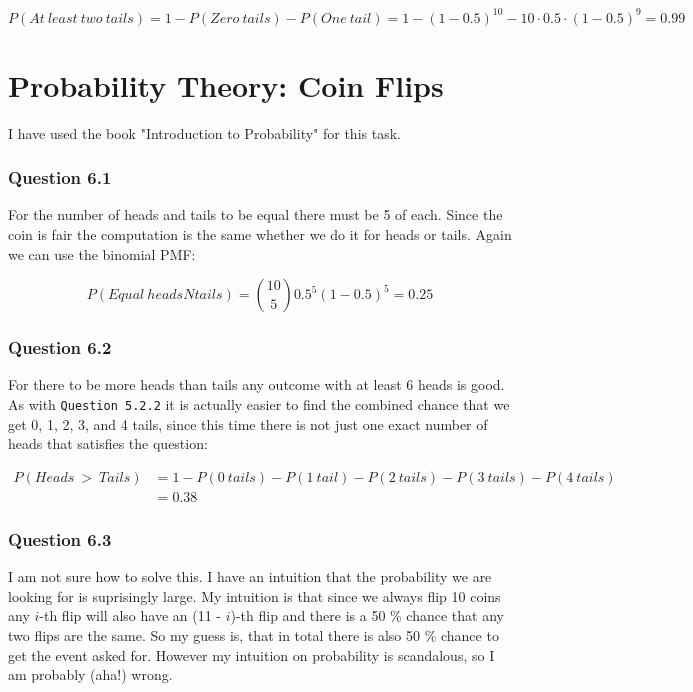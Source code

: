 \documentclass{article}
\begin{document}
\[
P(At\ least\ two\ tails) = 1 - P(Zero\ tails) - P(One\ tail) =
1 - (1-0.5)^{10} - 10 \cdot 0.5 \cdot (1-0.5)^9 = 0.99
\]

\section{Probability Theory: Coin Flips}
I have used the book "Introduction to Probability" \cite{prob} for this task.

\subsubsection*{Question 6.1}
For the number of heads and tails to be equal there must be 5 of each. Since the
coin is fair the computation is the same whether we do it for heads or tails. Again we can use the binomial PMF:

\[
P(Equal \ headsNtails) = {{10}\choose{5}} 0.5^5(1-0.5)^5 = 0.25
\]


\subsubsection*{Question 6.2}
For there to be more heads than tails any outcome with at least 6 heads is
good. As with \texttt{Question 5.2.2} it is actually easier to find the combined
chance that we get 0, 1, 2, 3, and 4 tails, since this time there is not just one
exact number of heads that satisfies the question:

\[
\begin{array}{ll}
  P(Heads \ > \ Tails) & = 1 - P(0\ tails) - P(1\ tail) - P(2\ tails) - P(3
  \ tails) - P(4 \ tails)\\ & = 0.38
\end{array}
\]


\subsubsection*{Question 6.3}
I am not sure how to solve this. I have an intuition that the probability we are
looking for is suprisingly large. My intuition is that since we always flip 10
coins any \(i\)-th flip will also have an (11 - \(i\))-th flip and there is a 50
\% chance that any two flips are the same. So my guess is, that in total there
is also 50 \% chance to get the event asked for. However my intuition on
probability is scandalous, so I am probably (aha!) wrong.

\printbibliography
\end{document}
